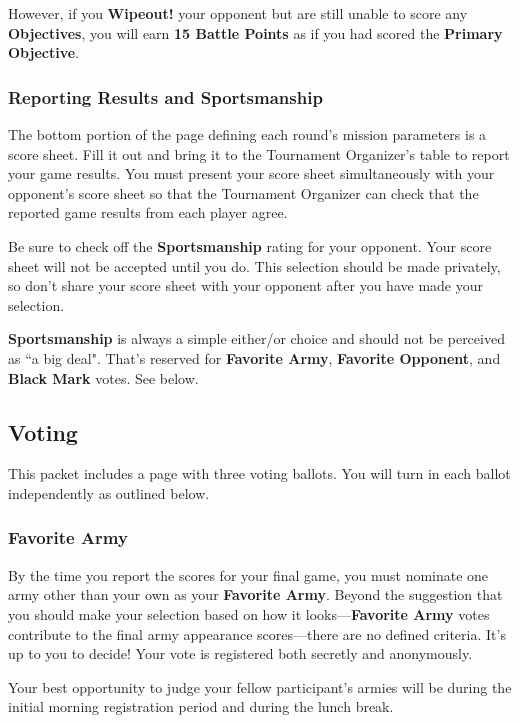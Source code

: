 \documentclass[12pt,titlepage]{article}
\begin{document}
However, if you \textbf{Wipeout!} your opponent but are still unable to score any \textbf{Objectives}, you will earn \textbf{15 Battle Points} as if you had scored the \textbf{Primary Objective}.

\subsubsection*{Reporting Results and Sportsmanship}

The bottom portion of the page defining each round's mission parameters is a score sheet. Fill it out and bring it to the Tournament Organizer's table to report your game results. You must present your score sheet simultaneously with your opponent's score sheet so that the Tournament Organizer can check that the reported game results from each player agree.

Be sure to check off the \textbf{Sportsmanship} rating for your opponent. Your score sheet will not be accepted until you do. This selection should be made privately, so don't share your score sheet with your opponent after you have made your selection.

\textbf{Sportsmanship} is always a simple either/or choice and should not be perceived as ``a big deal". That's reserved for \textbf{Favorite Army}, \textbf{Favorite Opponent}, and \textbf{Black Mark} votes. See below.

\subsection*{Voting}

This packet includes a page with three voting ballots. You will turn in each ballot independently as outlined below.

\subsubsection*{Favorite Army}

By the time you report the scores for your final game, you must nominate one army other than your own as your \textbf{Favorite Army}. Beyond the suggestion that you should make your selection based on how it looks---\textbf{Favorite Army} votes contribute to the final army appearance scores---there are no defined criteria. It's up to you to decide! Your vote is registered both secretly and anonymously.

Your best opportunity to judge your fellow participant's armies will be during the initial morning registration period and during the lunch break.
\end{document}
